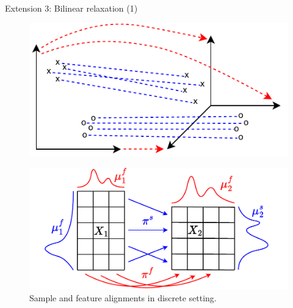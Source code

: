\documentclass{beamer}
\begin{document}
\begin{frame}{Extension 3: Bilinear relaxation (1)}
  \begin{figure}
    \centering
    \includegraphics[width=0.7\linewidth, keepaspectratio=true]{OT_new/coot_new.pdf}
  \end{figure}

  \begin{figure}
    \centering
    \includegraphics[width=0.7\linewidth, keepaspectratio=true]{OT_new/coot_matrix_ot.pdf}
    \caption*{\scriptsize{Sample and feature alignments in discrete setting.}}
  \end{figure}
\end{frame}
\end{document}
